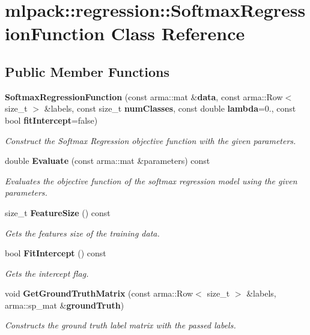 \section{mlpack\+:\+:regression\+:\+:Softmax\+Regression\+Function Class Reference}
\label{classmlpack_1_1regression_1_1SoftmaxRegressionFunction}
\subsection*{Public Member Functions}
\begin{DoxyCompactItemize}
\item 
{\bf Softmax\+Regression\+Function} (const arma\+::mat \&{\bf data}, const arma\+::\+Row$<$ size\+\_\+t $>$ \&labels, const size\+\_\+t {\bf num\+Classes}, const double {\bf lambda}=0., const bool {\bf fit\+Intercept}=false)
\begin{DoxyCompactList}\small\item\em Construct the Softmax Regression objective function with the given parameters. \end{DoxyCompactList}\item 
double {\bf Evaluate} (const arma\+::mat \&parameters) const 
\begin{DoxyCompactList}\small\item\em Evaluates the objective function of the softmax regression model using the given parameters. \end{DoxyCompactList}\item 
size\+\_\+t {\bf Feature\+Size} () const 
\begin{DoxyCompactList}\small\item\em Gets the features size of the training data. \end{DoxyCompactList}\item 
bool {\bf Fit\+Intercept} () const 
\begin{DoxyCompactList}\small\item\em Gets the intercept flag. \end{DoxyCompactList}\item 
void {\bf Get\+Ground\+Truth\+Matrix} (const arma\+::\+Row$<$ size\+\_\+t $>$ \&labels, arma\+::sp\+\_\+mat \&{\bf ground\+Truth})
\begin{DoxyCompactList}\small\item\em Constructs the ground truth label matrix with the passed labels. \end{DoxyCompactList}\item 

\end{DoxyCompactItemize}
